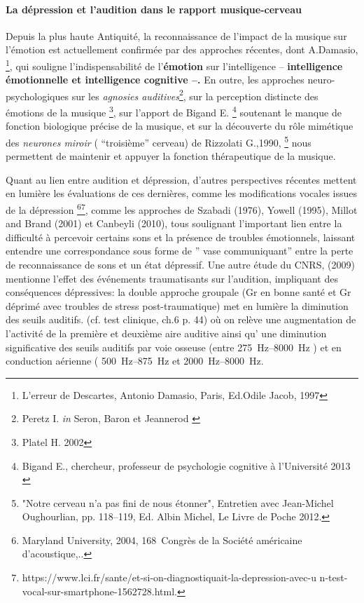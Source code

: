                 

\paragraph{ La dépression et l'audition dans le rapport
  musique-cerveau}

Depuis la plus haute Antiquité,  la reconnaissance de
l'impact de la musique sur l'émotion est actuellement confirmée par
des approches récentes, dont A.Damasio, \footnote {{L'erreur de
    Descartes}, Antonio Damasio, Paris, 
Ed.Odile Jacob, 1997}, qui souligne l'indispensabilité de l'\textbf{émotion}
sur l'intelligence --  \textbf{intelligence émotionnelle et intelligence
cognitive --.}
En outre, les approches neuro-psychologiques sur les \textit{agnosies
  auditives}\footnote { Peretz
  I. \textit{in} Seron, Baron et Jeannerod \autocite[<<\,Les agnosies auditives\,>>,
  pp. 205--216]{seron.baron.ea:neuropsychologie}},
sur la perception distincte des émotions de la musique \footnote
{Platel H. 2002\autocite[pp. 223--224]{platel_neuropsychology_2002}}, 
sur l'apport de Bigand E. \footnote {Bigand E., chercheur, professeur 
de psychologie cognitive à l'Université 2013 \autocite[Ch. 3
p. 35, "Vous avez l'oreille musicale"]{bigand:cerveau} } soutenant le
manque de fonction biologique précise de la musique,
et sur la
découverte du rôle mimétique des\textit{ neurones miroir }( ``troisième''
cerveau) de Rizzolati G.,1990, \footnote{"Notre cerveau n'a pas fini de nous étonner", Entretien avec Jean-Michel 
     Oughourlian, pp. 118--119, Ed. Albin Michel, Le Livre de Poche
     2012.} nous permettent de maintenir et
appuyer 
la fonction thérapeutique de la musique.








   

 
Quant au lien entre audition et dépression, d'autres perspectives
récentes mettent en lumière les évaluations de ces dernières, comme 
les modifications vocales issues de la dépression \footnote{ Maryland
  University, 2004, 168\ieme\ Congrès de la Société
américaine d'acoustique,.\autocite{le_service_metronews}.}\footnote{https://www.lci.fr/sante/et-si-on-diagnostiquait-la-depression-avec-u
n-test-vocal-sur-smartphone-1562728.html.},
comme les approches de Szabadi (1976), Yowell (1995), Millot and Brand (2001) et 
Canbeyli (2010), tous soulignant l'important lien entre la difficulté
à percevoir certains sons et la présence de troubles émotionnels,
laissant entendre une correspondance sous forme de '' vase communiquant''
entre la perte de reconnaissance de
sons et un état dépressif.
Une autre étude du CNRS, (2009) mentionne l'effet des événements
traumatisants sur l'audition, impliquant des conséquences dépressives:
la double approche groupale (Gr en bonne santé et Gr déprimé avec
troubles de stress post-traumatique) met en lumière la diminution des
seuils auditifs. (cf. test clinique, ch.6 p. 44) où on relève une augmentation de l'activité de la
première et deuxième aire auditive ainsi qu' une diminution significative des
seuils auditifs par voie osseuse (entre
\SIrange{275}{8000}{\Hz} ) et en conduction aérienne (
\SIrange{500}{875}{\Hz} et  \SIrange{2000}{8000}{\Hz}. 

